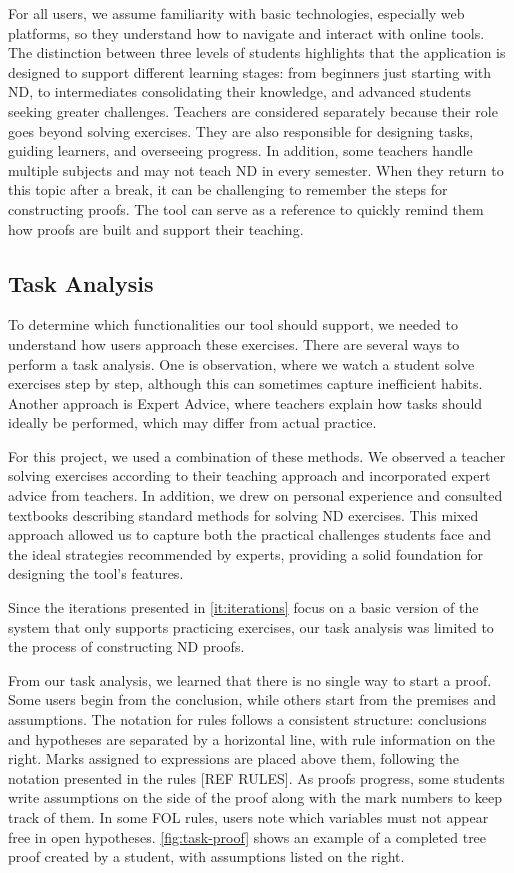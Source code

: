 For all users, we assume familiarity with basic technologies, especially web platforms, so they understand how to navigate and interact with online tools. The distinction between three levels of students highlights that the application is designed to support different learning stages: from beginners just starting with \gls{ND}, to intermediates consolidating their knowledge, and advanced students seeking greater challenges. Teachers are considered separately because their role goes beyond solving exercises. They are also responsible for designing tasks, guiding learners, and overseeing progress. In addition, some teachers handle multiple subjects and may not teach \gls{ND} in every semester. When they return to this topic after a break, it can be challenging to remember the steps for constructing proofs. The tool can serve as a reference to quickly remind them how proofs are built and support their teaching.


\subsection{Task Analysis}
To determine which functionalities our tool should support, we needed to understand how users approach these exercises. There are several ways to perform a task analysis. One is observation, where we watch a student solve exercises step by step, although this can sometimes capture inefficient habits. Another approach is Expert Advice, where teachers explain how tasks should ideally be performed, which may differ from actual practice.

For this project, we used a combination of these methods. We observed a teacher solving exercises according to their teaching approach and incorporated expert advice from teachers. In addition, we drew on personal experience and consulted textbooks describing standard methods for solving \gls{ND} exercises. This mixed approach allowed us to capture both the practical challenges students face and the ideal strategies recommended by experts, providing a solid foundation for designing the tool’s features.

Since the iterations presented in \autoref{it:iterations} focus on a basic version of the system that only supports practicing exercises, our task analysis was limited to the process of constructing \gls{ND} proofs.

From our task analysis, we learned that there is no single way to start a proof. Some users begin from the conclusion, while others start from the premises and assumptions. The notation for rules follows a consistent structure: conclusions and hypotheses are separated by a horizontal line, with rule information on the right. Marks assigned to expressions are placed above them, following the notation presented in the rules [REF RULES]. As proofs progress, some students write assumptions on the side of the proof along with the mark numbers to keep track of them. In some \gls{FOL} rules, users note which variables must not appear free in open hypotheses. \autoref{fig:task-proof} shows an example of a completed tree proof created by a student, with assumptions listed on the right.

